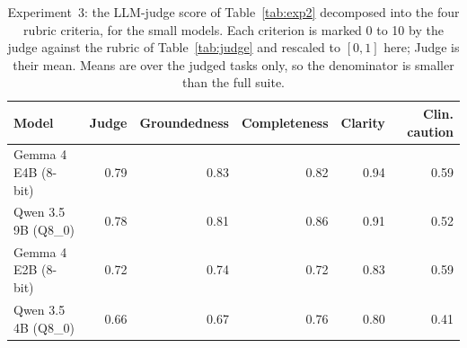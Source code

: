 \begin{table}[H]
\centering
\caption{Experiment~3: the LLM-judge score of Table~\ref{tab:exp2} decomposed into the four rubric criteria, for the small models. Each criterion is marked 0 to 10 by the judge against the rubric of Table~\ref{tab:judge} and rescaled to $[0,1]$ here; Judge is their mean. Means are over the judged tasks only, so the denominator is smaller than the full suite.}
\label{tab:exp2_judge}
\small
\setlength{\tabcolsep}{5pt}
\begin{tabular}{@{}l rrrrr@{}}
\toprule
Model & Judge & Groundedness & Completeness & Clarity & Clin. caution \\
\midrule
Gemma 4 E4B (8-bit) & 0.79 & 0.83 & 0.82 & 0.94 & 0.59 \\
Qwen 3.5 9B (Q8\_0) & 0.78 & 0.81 & 0.86 & 0.91 & 0.52 \\
Gemma 4 E2B (8-bit) & 0.72 & 0.74 & 0.72 & 0.83 & 0.59 \\
Qwen 3.5 4B (Q8\_0) & 0.66 & 0.67 & 0.76 & 0.80 & 0.41 \\
\bottomrule
\end{tabular}
\end{table}
